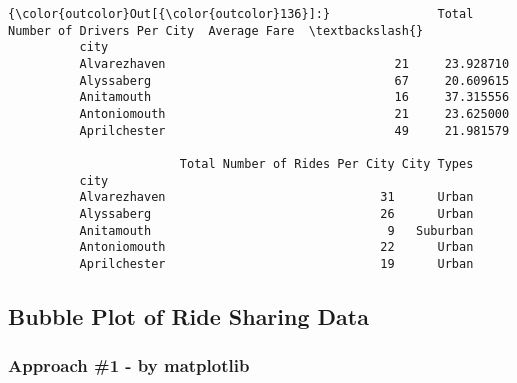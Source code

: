 \documentclass[11pt]{article}
\begin{document}
\begin{Verbatim}[commandchars=\\\{\}]
{\color{outcolor}Out[{\color{outcolor}136}]:}               Total Number of Drivers Per City  Average Fare  \textbackslash{}
          city                                                           
          Alvarezhaven                                21     23.928710   
          Alyssaberg                                  67     20.609615   
          Anitamouth                                  16     37.315556   
          Antoniomouth                                21     23.625000   
          Aprilchester                                49     21.981579   
          
                        Total Number of Rides Per City City Types  
          city                                                     
          Alvarezhaven                              31      Urban  
          Alyssaberg                                26      Urban  
          Anitamouth                                 9   Suburban  
          Antoniomouth                              22      Urban  
          Aprilchester                              19      Urban  
\end{Verbatim}
            
    \subsection{Bubble Plot of Ride Sharing
Data}\label{bubble-plot-of-ride-sharing-data}

    \subsubsection{Approach \#1 - by
matplotlib}\label{approach-1---by-matplotlib}
\end{document}
